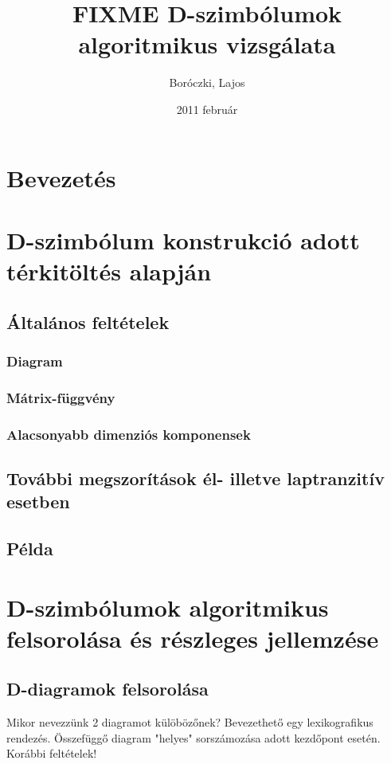 \documentclass[12pt,magyar,a4paper]{article}
\begin{document}
\title{FIXME D-szimbólumok algoritmikus vizsgálata}
\author{Boróczki, Lajos}
\date{2011 február}
\maketitle

\begin{abstract}
\end{abstract}

\section{Bevezetés}

\section{D-szimbólum konstrukció adott térkitöltés alapján}
\subsection{Általános feltételek}
\subsubsection{Diagram}
\subsubsection{Mátrix-függvény}
\subsubsection{Alacsonyabb dimenziós komponensek}
\subsection{További megszorítások él- illetve laptranzitív esetben}
\subsection{Példa}

\section{D-szimbólumok algoritmikus felsorolása és részleges jellemzése}
\subsection{D-diagramok felsorolása}
Mikor nevezzünk 2 diagramot külöbözőnek? Bevezethető egy lexikografikus rendezés.
Összefüggő diagram "helyes" sorszámozása adott kezdőpont esetén.
Korábbi feltételek!
\end{document}
